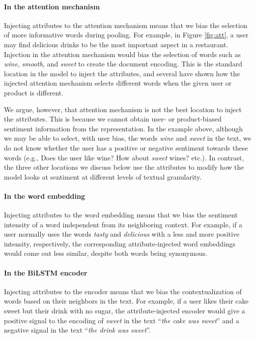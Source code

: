 \documentclass[11pt,a4paper]{article}
\begin{document}
\paragraph{In the attention mechanism}

Injecting attributes to the attention mechanism means that we bias the selection of more informative words during pooling. For example, in Figure \ref{fig:att}, a user may find delicious drinks to be the most important aspect in a restaurant. Injection in the attention mechanism would bias the selection of words such as \textit{wine}, \textit{smooth}, and \textit{sweet} to create the document encoding. This is the standard location in the model to inject the attributes, and several \cite{chen2016neural,amplayo2018cold} have shown how the injected attention mechanism selects different words when the given user or product is different.

We argue, however, that attention mechanism is not the best location to inject the attributes. This is because we cannot obtain user- or product-biased sentiment information from the representation. In the example above, although we may be able to select, with user bias, the words \textit{wine} and \textit{sweet} in the text, we do not know whether the user has a positive or negative sentiment towards these words (e.g., Does the user like wine? How about \textit{sweet} wines? etc.). In contrast, the three other locations we discuss below use the attributes to modify how the model looks at sentiment at different levels of textual granularity.

\paragraph{In the word embedding}

Injecting attributes to the word embedding means that we bias the sentiment intensity of a word independent from its neighboring context. For example, if a user normally uses the words \textit{tasty} and \textit{delicious} with a less and more positive intensity, respectively, the corresponding attribute-injected word embeddings would come out less similar, despite both words being synonymous.

\paragraph{In the BiLSTM encoder}

Injecting attributes to the encoder means that we bias the contextualization of words based on their neighbors in the text. For example, if a user likes their cake sweet but their drink with no sugar, the attribute-injected encoder would give a positive signal to the encoding of \textit{sweet} in the text ``\textit{the cake was sweet}'' and a negative signal in the text ``\textit{the drink was sweet}''.
\end{document}
